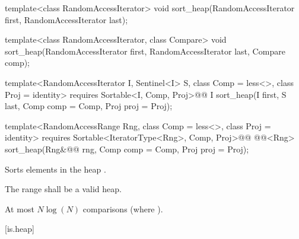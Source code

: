 %
\begin{removedblock}
\begin{itemdecl}
template<class RandomAccessIterator>
  void sort_heap(RandomAccessIterator first, RandomAccessIterator last);

template<class RandomAccessIterator, class Compare>
  void sort_heap(RandomAccessIterator first, RandomAccessIterator last,
                 Compare comp);
\end{itemdecl}
\end{removedblock}
\begin{addedblock}
\begin{itemdecl}
template<RandomAccessIterator I, Sentinel<I> S, class Comp = less<>,
    class Proj = identity>
  requires Sortable<I, Comp, Proj>@\newtxt{()}@
  I sort_heap(I first, S last, Comp comp = Comp{}, Proj proj = Proj{});

template<RandomAccessRange Rng, class Comp = less<>, class Proj = identity>
  requires Sortable<IteratorType<Rng>, Comp, Proj>@\newtxt{()}@
  @@<Rng>
    sort_heap(Rng&@\newtxt{\&}@ rng, Comp comp = Comp{}, Proj proj = Proj{});
\end{itemdecl}
\end{addedblock}

\begin{itemdescr}
\pnum
\effects
Sorts elements in the heap
.

\pnum
\requires The range  shall be a valid heap.

\begin{addedblock}
\pnum
\returns {}
\end{addedblock}

\pnum
\complexity
At most $N \log(N)$
comparisons (where
).
\end{itemdescr}

[is.heap]{}

